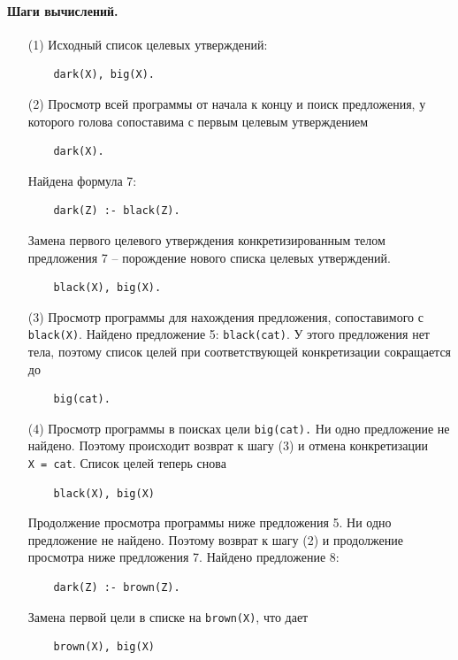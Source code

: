 \documentclass[12pt, openany, twoside]{book} %
\begin{document}
\paragraph{Шаги вычислений.}
\begin{itemize}
\item[(1)] Исходный список целевых утверждений:
{\tt\begin{verbatim}
    dark(X), big(X).
\end{verbatim}}

\item[(2)] Просмотр всей программы от начала к концу и поиск предложения, у которого голова сопоставима с первым целевым утверждением
{\tt\begin{verbatim}
    dark(X).
\end{verbatim}}

\noindent Найдена формула 7:

{\tt\begin{verbatim}
    dark(Z) :- black(Z).
\end{verbatim}}

\noindent Замена первого целевого утверждения конкретизированным телом предложения 7 -- порождение нового списка целевых утверждений.

{\tt\begin{verbatim}
    black(X), big(X).
\end{verbatim}}

\item[(3)] Просмотр программы для нахождения предложения, сопоставимого с \texttt{black(X)}. Найдено предложение 5: \texttt{black(cat)}. У этого предложения нет тела, поэтому список целей при соответствующей конкретизации сокращается до
{\tt\begin{verbatim}
    big(cat).
\end{verbatim}}

\item[(4)] Просмотр программы в поисках цели \texttt{big(cat).} Ни одно предложение не найдено. Поэтому происходит возврат к шагу (3) и отмена конкретизации {\tt X~=~cat}.
Список целей теперь снова
{\tt\begin{verbatim}
    black(X), big(X)
\end{verbatim}}

\noindent Продолжение просмотра программы ниже предложения 5. Ни одно предложение не найдено. Поэтому возврат к шагу (2) и продолжение просмотра ниже предложения 7. Найдено предложение 8:
{\tt\begin{verbatim}
    dark(Z) :- brown(Z).
\end{verbatim}}
\noindent   Замена первой цели в списке на \texttt{brown(Х)}, что дает
{\tt\begin{verbatim}
    brown(X), big(X)
\end{verbatim}}


\end{itemize}
\end{document}
